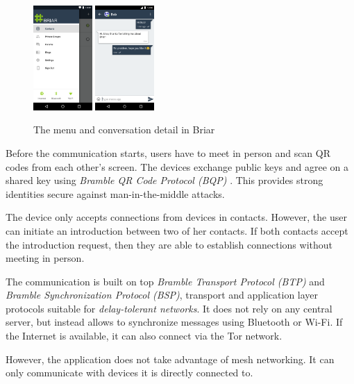 \documentclass[conference,compsoc]{IEEEtran}
\begin{document}
\begin{figure}[h]
  \centering
  \includegraphics[width=0.2\textwidth]{briar1}
  \includegraphics[width=0.2\textwidth]{briar2}
  \caption{The menu and conversation detail in Briar \cite{briar_gplay}}
\end{figure}

Before the communication starts, users have to meet in person and scan QR codes from each other's screen. The devices exchange public keys and agree on a shared key using \textit{Bramble QR Code Protocol (BQP)} \cite{briar_bqp}.
This provides strong identities secure against man-in-the-middle attacks.

The device only accepts connections from devices in contacts. However, the user can initiate an introduction between two of her contacts. If both contacts accept the introduction request, then they are able to establish connections without meeting in person.

The communication is built on top \textit{Bramble Transport Protocol (BTP)} and \textit{Bramble Synchronization Protocol (BSP)}, transport and application layer protocols suitable for \textit{delay-tolerant networks}. \cite{briar_stack} It does not rely on any central server, but instead allows to synchronize messages using Bluetooth or Wi-Fi. If the Internet is available, it can also connect via the Tor network.

However, the application does not take advantage of mesh networking. It can only communicate with devices it is directly connected to.
\end{document}
